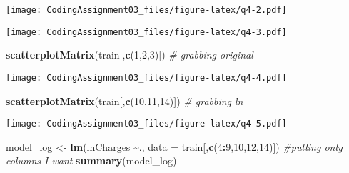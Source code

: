 \documentclass[
]{article}
\newenvironment{Shaded}{\begin{snugshade}}{\end{snugshade}}
\newcommand{\AttributeTok}[1]{\textcolor[rgb]{0.13,0.29,0.53}{#1}}
\newcommand{\CommentTok}[1]{\textcolor[rgb]{0.56,0.35,0.01}{\textit{#1}}}
\newcommand{\DecValTok}[1]{\textcolor[rgb]{0.00,0.00,0.81}{#1}}
\newcommand{\FunctionTok}[1]{\textcolor[rgb]{0.13,0.29,0.53}{\textbf{#1}}}
\newcommand{\NormalTok}[1]{#1}
\newcommand{\OtherTok}[1]{\textcolor[rgb]{0.56,0.35,0.01}{#1}}
\newcommand{\SpecialCharTok}[1]{\textcolor[rgb]{0.81,0.36,0.00}{\textbf{#1}}}
\begin{document}
\texttt{[image: CodingAssignment03\_files/figure-latex/q4-2.pdf]}

\begin{Shaded}
\end{Shaded}

\texttt{[image: CodingAssignment03\_files/figure-latex/q4-3.pdf]}

\begin{Shaded}
\begin{Highlighting}[]
\FunctionTok{scatterplotMatrix}\NormalTok{(train[,}\FunctionTok{c}\NormalTok{(}\DecValTok{1}\NormalTok{,}\DecValTok{2}\NormalTok{,}\DecValTok{3}\NormalTok{)]) }\CommentTok{\# grabbing original}
\end{Highlighting}
\end{Shaded}

\texttt{[image: CodingAssignment03\_files/figure-latex/q4-4.pdf]}

\begin{Shaded}
\begin{Highlighting}[]
\FunctionTok{scatterplotMatrix}\NormalTok{(train[,}\FunctionTok{c}\NormalTok{(}\DecValTok{10}\NormalTok{,}\DecValTok{11}\NormalTok{,}\DecValTok{14}\NormalTok{)]) }\CommentTok{\# grabbing ln}
\end{Highlighting}
\end{Shaded}

\texttt{[image: CodingAssignment03\_files/figure-latex/q4-5.pdf]}

\begin{Shaded}
\begin{Highlighting}[]
\NormalTok{model\_log }\OtherTok{\textless{}{-}} \FunctionTok{lm}\NormalTok{(lnCharges }\SpecialCharTok{\textasciitilde{}}\NormalTok{., }\AttributeTok{data =}\NormalTok{ train[,}\FunctionTok{c}\NormalTok{(}\DecValTok{4}\SpecialCharTok{:}\DecValTok{9}\NormalTok{,}\DecValTok{10}\NormalTok{,}\DecValTok{12}\NormalTok{,}\DecValTok{14}\NormalTok{)]) }\CommentTok{\#pulling only columns I want}
\FunctionTok{summary}\NormalTok{(model\_log)}
\end{Highlighting}
\end{Shaded}
\end{document}
